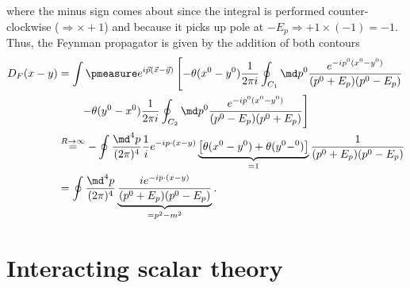 where the minus sign comes about since the integral is performed counter-clockwise ($\Rightarrow \times +1$) and because it picks up pole at $-E_p \Rightarrow +1 \times (-1)=-1$. Thus, the Feynman propagator is given by the addition of both contours
\begin{align*}
	D_F(x-y) &= \int \pmeasure e^{i \vec{p}(\vec{x}-\vec{y})} \left[-\theta(x^0-y^0) \frac{1}{2 \pi i} \oint_{C_1} \md p^0 \frac{e^{-i p^0(x^0-y^0)}}{(p^0+E_p)(p^0-E_p)} \right.\\
	&\left. \qquad - \theta(y^0-x^0) \frac{1}{2 \pi i} \oint_{C_2} \md p^0 \frac{e^{-i p^0(x^0-y^0)}}{(p^0-E_p)(p^0+E_p)}\right]\\
		&\stackrel{R\rightarrow\infty}{=} - \oint \frac{\md^4 p}{(2 \pi)^4} \frac{1}{i} e^{-i p\cdot (x-y)} \underbrace{\left[\theta(x^0-y^0)+\theta(y^0-^0)\right]}_{=1} \frac{1}{(p^0+E_p)(p^0-E_p)} \\
		&= \oint \frac{\md^4 p}{(2 \pi)^4} \underbrace{\frac{i e^{-i p\cdot(x-y)} }{(p^0+E_p)(p^0-E_p)}}_{=p^2-m^2}.
\end{align*}




\newpage





\section{Interacting scalar theory}
